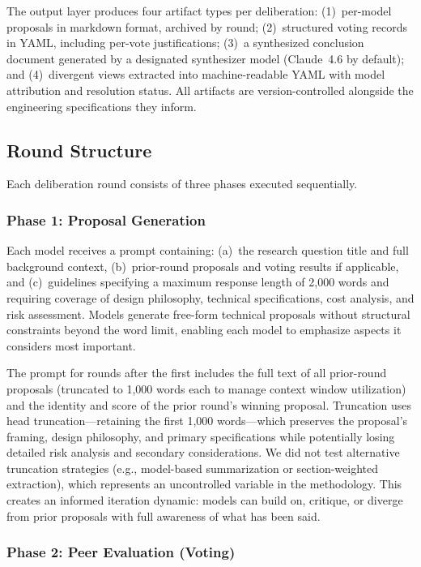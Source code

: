 \documentclass[11pt,a4paper]{article}
\begin{document}
The output layer produces four artifact types per deliberation: (1)~per-model proposals in markdown format, archived by round; (2)~structured voting records in YAML, including per-vote justifications; (3)~a synthesized conclusion document generated by a designated synthesizer model (Claude~4.6 by default); and (4)~divergent views extracted into machine-readable YAML with model attribution and resolution status. All artifacts are version-controlled alongside the engineering specifications they inform.

\subsection{Round Structure}
\label{sec:rounds}

Each deliberation round consists of three phases executed sequentially.

\subsubsection{Phase 1: Proposal Generation}

Each model receives a prompt containing: (a)~the research question title and full background context, (b)~prior-round proposals and voting results if applicable, and (c)~guidelines specifying a maximum response length of 2{,}000 words and requiring coverage of design philosophy, technical specifications, cost analysis, and risk assessment. Models generate free-form technical proposals without structural constraints beyond the word limit, enabling each model to emphasize aspects it considers most important.

The prompt for rounds after the first includes the full text of all prior-round proposals (truncated to 1{,}000 words each to manage context window utilization) and the identity and score of the prior round's winning proposal. Truncation uses head truncation---retaining the first 1{,}000 words---which preserves the proposal's framing, design philosophy, and primary specifications while potentially losing detailed risk analysis and secondary considerations. We did not test alternative truncation strategies (e.g., model-based summarization or section-weighted extraction), which represents an uncontrolled variable in the methodology. This creates an informed iteration dynamic: models can build on, critique, or diverge from prior proposals with full awareness of what has been said.

\subsubsection{Phase 2: Peer Evaluation (Voting)}
\end{document}

